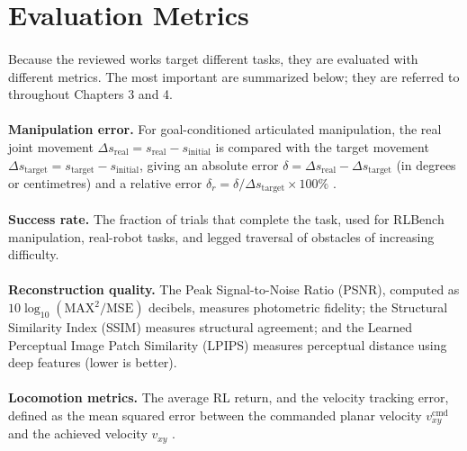 \documentclass[12pt,a4paper,final]{extreport}
\begin{document}
\section{Evaluation Metrics}

\paragraph{} Because the reviewed works target different tasks, they are evaluated with different metrics. The most important are summarized below; they are referred to throughout Chapters 3 and 4.

\paragraph{} \textbf{Manipulation error.} For goal-conditioned articulated manipulation, the real joint movement $\Delta s_{\mathrm{real}}=s_{\mathrm{real}}-s_{\mathrm{initial}}$ is compared with the target movement $\Delta s_{\mathrm{target}}=s_{\mathrm{target}}-s_{\mathrm{initial}}$, giving an absolute error $\delta=\Delta s_{\mathrm{real}}-\Delta s_{\mathrm{target}}$ (in degrees or centimetres) and a relative error $\delta_r=\delta/\Delta s_{\mathrm{target}}\times100\%$ \cite{p1}.

\paragraph{} \textbf{Success rate.} The fraction of trials that complete the task, used for RLBench manipulation, real-robot tasks, and legged traversal of obstacles of increasing difficulty.

\paragraph{} \textbf{Reconstruction quality.} The Peak Signal-to-Noise Ratio (PSNR), computed as $10\log_{10}(\mathrm{MAX}^2/\mathrm{MSE})$ decibels, measures photometric fidelity; the Structural Similarity Index (SSIM) measures structural agreement; and the Learned Perceptual Image Patch Similarity (LPIPS) measures perceptual distance using deep features (lower is better).

\paragraph{} \textbf{Locomotion metrics.} The average RL return, and the velocity tracking error, defined as the mean squared error between the commanded planar velocity $v^{\mathrm{cmd}}_{xy}$ and the achieved velocity $v_{xy}$ \cite{p3}.
\end{document}
